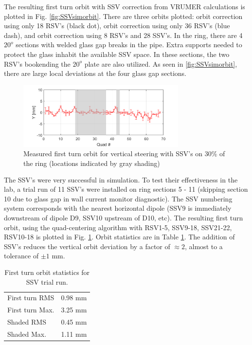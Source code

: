 The resulting first turn orbit with SSV correction from VRUMER calculations is plotted in Fig. \ref{fig:SSVsimorbit}. There are three orbits plotted: orbit correction using only 18 RSV's (black dot), orbit correction using only 36 RSV's (blue dash), and orbit correction using 8 RSV's and 28 SSV's. In the ring, there are 4 $20^o$ sections with welded glass gap breaks in the pipe. Extra supports needed to protect the glass inhabit the available SSV space. In these sections, the two RSV's bookending the $20^o$ plate are also utilized. As seen in \ref{fig:SSVsimorbit}, there are large local deviations at the four glass gap sections.


\begin{figure}[htb]
\centering
\includegraphics[width=0.75\textwidth]{4.figures/SSV/vert_steering_with_ssv_170831.png}
\caption{Measured first turn orbit for vertical steering with SSV's on 30\% of the ring (locations indicated by gray shading)}
\label{fig:SSVexporbit}
\end{figure}

The SSV's were very successful in simulation. To test their effectiveness in the lab, a trial run of 11 SSV's were installed on ring sections 5 - 11 (skipping section 10 due to glass gap in wall current monitor diagnostic). The SSV numbering system corresponds with the nearest horizontal dipole (SSV9 is immediately downstream of dipole D9, SSV10 upstream of D10, etc). The resulting first turn orbit, using the quad-centering algorithm with RSV1-5, SSV9-18, SSV21-22, RSV10-18 is plotted in Fig. \ref{fig:SSVexporbit}. Orbit statistics are in Table \ref{tab:SSVexporbit}. The addition of SSV's reduces the vertical orbit deviation by a factor of $\approx 2$, almost to a tolerance of $\pm 1$ mm.   

\begin{table}[h]
\centering
\caption{First turn orbit statistics for SSV trial run.}
\label{tab:SSVexporbit}
\begin{tabular}{|l|c|}
\hline
First turn RMS & 0.98 mm\\
First turn Max. & 3.25 mm\\
Shaded RMS & 0.45 mm\\
Shaded Max. & 1.11 mm \\
\hline
\end{tabular}
\end{table}



